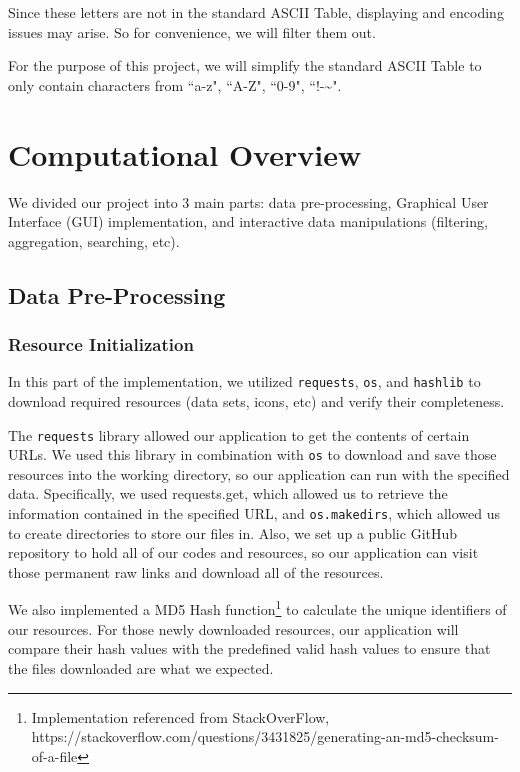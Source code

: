 \documentclass[fontsize=11pt]{article}
\begin{document}
    Since these letters are not in the standard ASCII Table, displaying and encoding issues may arise. So for convenience, we will filter them out.

    For the purpose of this project, we will simplify the standard ASCII Table to only contain characters from ``a-z", ``A-Z", ``0-9", ``!-\~{}".

    \newpage

    \section{Computational Overview}

    We divided our project into 3 main parts: data pre-processing, Graphical User Interface (GUI) implementation, and interactive data manipulations (filtering, aggregation, searching, etc).

    \subsection{Data Pre-Processing}

    \subsubsection{Resource Initialization}

    In this part of the implementation, we utilized \verb|requests|, \verb|os|, and \verb|hashlib| to download required resources (data sets, icons, etc) and verify their completeness.

    The \verb|requests| library allowed our application to get the contents of certain URLs. We used this library in combination with \verb|os| to download and save those resources into the working directory, so our application can run with the specified data. Specifically, we used requests.get, which allowed us to retrieve the information contained in the specified URL, and \verb|os.makedirs|, which allowed us to create directories to store our files in. Also, we set up a public GitHub repository to hold all of our codes and resources, so our application can visit those permanent raw links and download all of the resources.

    We also implemented a MD5 Hash function\footnote{Implementation referenced from StackOverFlow, https://stackoverflow.com/questions/3431825/generating-an-md5-checksum-of-a-file} to calculate the unique identifiers of our resources. For those newly downloaded resources, our application will compare their hash values with the predefined valid hash values to ensure that the files downloaded are what we expected.
\end{document}
